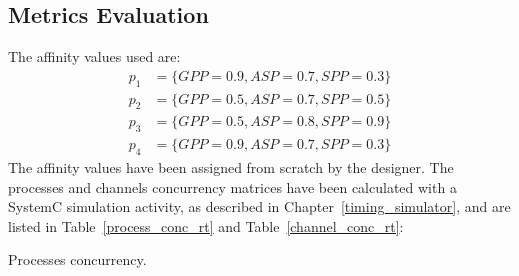 \subsection{Metrics Evaluation}
%
The affinity values used are:
%
\begin{align*}
    p_1 &= \{ GPP=0.9, ASP=0.7, SPP=0.3 \} \\
    p_2 &= \{ GPP=0.5, ASP=0.7, SPP=0.5 \} \\
    p_3 &= \{ GPP=0.5, ASP=0.8, SPP=0.9 \} \\
    p_4 &= \{ GPP=0.9, ASP=0.7, SPP=0.3 \} 
\end{align*}
%
The affinity values have been assigned from scratch by the designer. The processes and channels concurrency matrices have been calculated with a SystemC simulation activity, as described in Chapter~\ref{timing_simulator}, and are listed in Table~\ref{process_conc_rt} and Table~\ref{channel_conc_rt}: \par
%
\begin{table}[htbp]
\caption{Processes concurrency.}
\begin{center}
\label{process_conc_rt}
\end{center}
%
\bigskip
%
\caption{Channels concurrency.}
\begin{center}
\label{channel_conc_rt}
\end{center}
\end{table}
